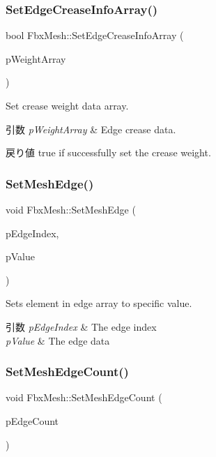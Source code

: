 \subsubsection{\texorpdfstring{Set\+Edge\+Crease\+Info\+Array()}{SetEdgeCreaseInfoArray()}}
{\footnotesize\ttfamily bool Fbx\+Mesh\+::\+Set\+Edge\+Crease\+Info\+Array (\begin{DoxyParamCaption}\item[{\hyperlink{class_fbx_array}{Fbx\+Array}$<$ double $>$ $\ast$}]{p\+Weight\+Array }\end{DoxyParamCaption})}

Set crease weight data array. 
\begin{DoxyParams}{引数}
{\em p\+Weight\+Array} & Edge crease data. \\
\hline
\end{DoxyParams}
\begin{DoxyReturn}{戻り値}
{\ttfamily true} if successfully set the crease weight. 
\end{DoxyReturn}
\mbox{\label{class_fbx_mesh_a0a1288c874a40992ae4db6c0905ca2c0}} 
\subsubsection{\texorpdfstring{Set\+Mesh\+Edge()}{SetMeshEdge()}}
{\footnotesize\ttfamily void Fbx\+Mesh\+::\+Set\+Mesh\+Edge (\begin{DoxyParamCaption}\item[{int}]{p\+Edge\+Index,  }\item[{int}]{p\+Value }\end{DoxyParamCaption})}

Sets element in edge array to specific value. 
\begin{DoxyParams}{引数}
{\em p\+Edge\+Index} & The edge index \\
\hline
{\em p\+Value} & The edge data \\
\hline
\end{DoxyParams}
\mbox{\label{class_fbx_mesh_a8a0ca6b1202ad971d3f504e801bf53ac}} 
\subsubsection{\texorpdfstring{Set\+Mesh\+Edge\+Count()}{SetMeshEdgeCount()}}
{\footnotesize\ttfamily void Fbx\+Mesh\+::\+Set\+Mesh\+Edge\+Count (\begin{DoxyParamCaption}\item[{int}]{p\+Edge\+Count }\end{DoxyParamCaption})}

